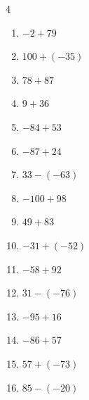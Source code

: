 \begin{multicols}{4}
\begin{enumerate}
        \phantom{$=26$}

  \item $-2+79$

        \phantom{$=77$}

  \item $100+(-35)$

        \phantom{$=65$}

\columnbreak %

  \item $78+87$

        \phantom{$=165$}

  \item $9+36$

        \phantom{$=45$}

  \item $-84+53$

        \phantom{$=-31$}

  \item $-87+24$

        \phantom{$=-63$}

  \item $33-(-63)$

        \phantom{$=96$}

  \item $-100+98$

        \phantom{$=-2$}

  \item $49+83$

        \phantom{$=132$}

  \item $-31+(-52)$

        \phantom{$=-83$}

  \item $-58+92$

        \phantom{$=34$}

  \item $31-(-76)$

        \phantom{$=107$}

  \item $-95+16$

        \phantom{$=-79$}

  \item $-86+57$

        \phantom{$=-29$}

  \item $57+(-73)$

        \phantom{$=-16$}

  \item $85-(-20)$


\end{enumerate}
\end{multicols}
